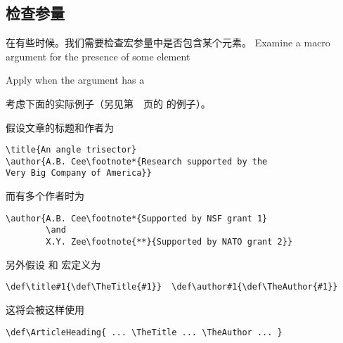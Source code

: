 \documentclass{book}
\begin{document}
\subsection{检查参量}

在有些时候。我们需要检查宏参量中是否包含某个元素。
\howto Examine a macro argument for the presence of some element\par
\howto Apply  when the argument has a \par
考虑下面的实际例子（另见第~\pageref{left:display}~页的
 的例子）。

假设文章的标题和作者为
\begin{verbatim}
\title{An angle trisector}
\author{A.B. Cee\footnote*{Research supported by the
Very Big Company of America}}
\end{verbatim}
而有多个作者时为
\begin{verbatim}
\author{A.B. Cee\footnote*{Supported by NSF grant 1}
        \and
        X.Y. Zee\footnote{**}{Supported by NATO grant 2}}
\end{verbatim}
另外假设  和  宏定义为
\begin{verbatim}
\def\title#1{\def\TheTitle{#1}}  \def\author#1{\def\TheAuthor{#1}}
\end{verbatim}
这将会被这样使用
\begin{verbatim}
\def\ArticleHeading{ ... \TheTitle ... \TheAuthor ... }
\end{verbatim}
\end{document}
